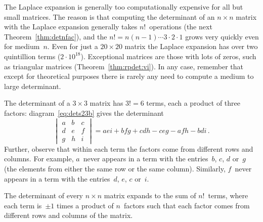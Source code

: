 \begin{example}
\begin{enumerate}
\end{enumerate}
\end{example}








The Laplace expansion is generally too computationally expensive for all but small matrices.
The reason is that computing the determinant of an \(n\times n\) matrix with the Laplace expansion generally takes \(n!\)~operations (the next Theorem~\ref{thm:detnfac}), and the  \(n!=n(n-1)\cdots3\cdot2\cdot1\) grows very quickly even for medium~\(n\).
Even for just a \(20\times20\) matrix the Laplace expansion has over two quintillion terms (\(2\cdot10^{18}\)).
Exceptional matrices are those with lots of zeros, such as triangular matrices (Theorem~\ref{thm:rpdet:vi}).
In any case, remember that except for theoretical purposes there is rarely any need to compute a medium to large determinant.



\begin{example} \label{eg:}
The determinant of a \(3\times3\) matrix has \(3!=6\) terms, each a product of three factors:
diagram~\eqref{eq:dets23b} gives the determinant
\begin{equation*}
\begin{vmatrix} a&b&c\\d&e&f\\g&h&i \end{vmatrix}=aei+bfg+cdh-ceg-afh-bdi\,.
\end{equation*}
Further, observe that within each term the factors come from different rows and columns.
For example, \(a\)~never appears in a term with the entries~\(b\), \(c\), \(d\) or~\(g\) (the elements from either the same row or the same column).
Similarly, \(f\)~never appears in a term with the entries~\(d\), \(e\), \(c\) or~\(i\).
\end{example}



\begin{theorem} \label{thm:detnfac}
The determinant of every \(n\times n\) matrix expands to the sum of \(n!\)~terms, where each term is~\(\pm1\) times a product of \(n\)~factors such that each factor comes from different rows and columns of the matrix.
\end{theorem}

